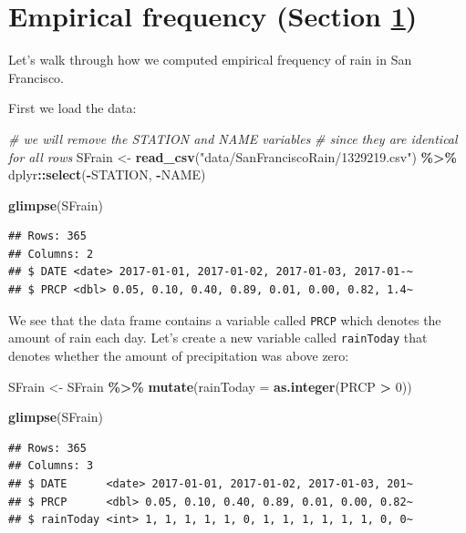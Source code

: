 \documentclass[
  12pt,
]{book}
\newenvironment{Shaded}{\begin{snugshade}}{\end{snugshade}}
\newcommand{\AttributeTok}[1]{\textcolor[rgb]{0.13,0.29,0.53}{#1}}
\newcommand{\CommentTok}[1]{\textcolor[rgb]{0.56,0.35,0.01}{\textit{#1}}}
\newcommand{\DecValTok}[1]{\textcolor[rgb]{0.00,0.00,0.81}{#1}}
\newcommand{\FunctionTok}[1]{\textcolor[rgb]{0.13,0.29,0.53}{\textbf{#1}}}
\newcommand{\NormalTok}[1]{#1}
\newcommand{\OtherTok}[1]{\textcolor[rgb]{0.56,0.35,0.01}{#1}}
\newcommand{\SpecialCharTok}[1]{\textcolor[rgb]{0.81,0.36,0.00}{\textbf{#1}}}
\newcommand{\StringTok}[1]{\textcolor[rgb]{0.31,0.60,0.02}{#1}}
\begin{document}
\hypertarget{empirical-frequency}{%
\section{Empirical frequency (Section \ref{empirical-frequency})}\label{empirical-frequency}}

Let's walk through how we computed empirical frequency of rain in San Francisco.

First we load the data:

\begin{Shaded}
\begin{Highlighting}[]
\CommentTok{\# we will remove the STATION and NAME variables }
\CommentTok{\# since they are identical for all rows}
\NormalTok{SFrain }\OtherTok{\textless{}{-}} \FunctionTok{read\_csv}\NormalTok{(}\StringTok{"data/SanFranciscoRain/1329219.csv"}\NormalTok{) }\SpecialCharTok{\%\textgreater{}\%} 
\NormalTok{  dplyr}\SpecialCharTok{::}\FunctionTok{select}\NormalTok{(}\SpecialCharTok{{-}}\NormalTok{STATION, }\SpecialCharTok{{-}}\NormalTok{NAME)}
  
\FunctionTok{glimpse}\NormalTok{(SFrain)}
\end{Highlighting}
\end{Shaded}

\begin{verbatim}
## Rows: 365
## Columns: 2
## $ DATE <date> 2017-01-01, 2017-01-02, 2017-01-03, 2017-01-~
## $ PRCP <dbl> 0.05, 0.10, 0.40, 0.89, 0.01, 0.00, 0.82, 1.4~
\end{verbatim}

We see that the data frame contains a variable called \texttt{PRCP} which denotes the amount of rain each day. Let's create a new variable called \texttt{rainToday} that denotes whether the amount of precipitation was above zero:

\begin{Shaded}
\begin{Highlighting}[]
\NormalTok{SFrain }\OtherTok{\textless{}{-}} 
\NormalTok{  SFrain }\SpecialCharTok{\%\textgreater{}\%}
  \FunctionTok{mutate}\NormalTok{(}\AttributeTok{rainToday =} \FunctionTok{as.integer}\NormalTok{(PRCP }\SpecialCharTok{\textgreater{}} \DecValTok{0}\NormalTok{))}

\FunctionTok{glimpse}\NormalTok{(SFrain)}
\end{Highlighting}
\end{Shaded}

\begin{verbatim}
## Rows: 365
## Columns: 3
## $ DATE      <date> 2017-01-01, 2017-01-02, 2017-01-03, 201~
## $ PRCP      <dbl> 0.05, 0.10, 0.40, 0.89, 0.01, 0.00, 0.82~
## $ rainToday <int> 1, 1, 1, 1, 1, 0, 1, 1, 1, 1, 1, 1, 0, 0~
\end{verbatim}
\end{document}
